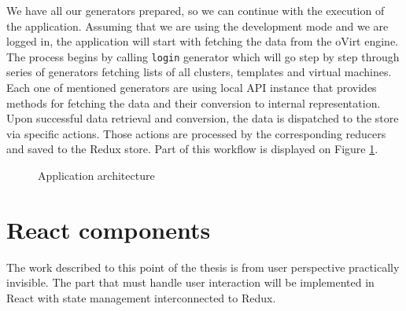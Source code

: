We have all our generators prepared, so we can continue with the execution of the application. Assuming that we are using the development mode and we are logged in, the application will start with fetching the data from the oVirt engine. The process begins by calling \texttt{login} generator which will go step by step through series of generators fetching lists of all clusters, templates and virtual machines. Each one of mentioned generators are using local API instance that provides methods for fetching the data and their conversion to internal representation. Upon successful data retrieval and conversion, the data is dispatched to the store via specific actions. Those actions are processed by the corresponding reducers and saved to the Redux store. Part of this workflow is displayed on 
Figure \ref{app_architecture}.

\begin{figure}[h]
\caption{Application architecture}
\label{app_architecture}
\end{figure}

\section{React components}
The work described to this point of the thesis is from user perspective practically invisible. The part that must handle user interaction will be implemented in React with state management interconnected to Redux. 

